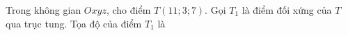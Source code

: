 \begin{ex}
Trong không gian $Oxyz$, cho điểm $T(11;3;7)$. Gọi $T_1$ là điểm đối xứng của $T$ qua trục tung. Tọa độ của điểm $T_1$ là
\end{ex}
